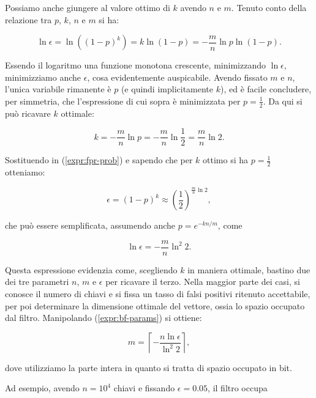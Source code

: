 Possiamo anche giungere al valore ottimo di $k$ avendo $n$ e $m$. Tenuto conto della relazione tra $p$, $k$, $n$ e $m$ si ha:

\begin{equation}
    \ln{\epsilon} = \ln{((1-p)^k)} = k \ln{(1-p)} = -\frac{m}{n} \ln{p} \ln{(1-p)} .
\end{equation}

Essendo il logaritmo una funzione monotona crescente, minimizzando $\ln{\epsilon}$, minimizziamo anche $\epsilon$, cosa evidentemente auspicabile. Avendo fissato $m$ e $n$, l'unica variabile rimanente è $p$ (e quindi implicitamente $k$), ed è facile concludere, per simmetria, che l'espressione di cui sopra è minimizzata per $p = \frac{1}{2}$. Da qui si può ricavare $k$ ottimale:

\begin{equation}
    k = -\frac{m}{n} \ln{p} = -\frac{m}{n} \ln{\frac{1}{2}} = \frac{m}{n} \ln{2} .
\end{equation}

Sostituendo in (\ref{expr:fpr-prob}) e sapendo che per $k$ ottimo si ha $p = \frac{1}{2}$ otteniamo:

\begin{equation}
    \epsilon = (1-p)^k \approx \left( \frac{1}{2} \right)^{\frac{m}{n} \ln{2}} ,
\end{equation}

\noindent che può essere semplificata, assumendo anche $p = e^{-kn/m}$, come

\begin{equation}
    \ln{\epsilon} = -\frac{m}{n} \ln^2 2 .
    \label{expr:bf-params}
\end{equation}

Questa espressione evidenzia come, scegliendo $k$ in maniera ottimale, bastino due dei tre parametri $n$, $m$ e $\epsilon$ per ricavare il terzo. Nella maggior parte dei casi, si conosce il numero di chiavi e si fissa un tasso di falsi positivi ritenuto accettabile, per poi determinare la dimensione ottimale del vettore, ossia lo spazio occupato dal filtro. Manipolando (\ref{expr:bf-params}) si ottiene:

\begin{equation}
    m = \left\lceil - \frac{n\ln{\epsilon}}{\ln^2 2} \right\rceil ,
\end{equation}

\noindent dove utilizziamo la parte intera in quanto si tratta di spazio occupato in bit.

Ad esempio, avendo $n=10^4$ chiavi e fissando $\epsilon=0.05$, il filtro occupa

